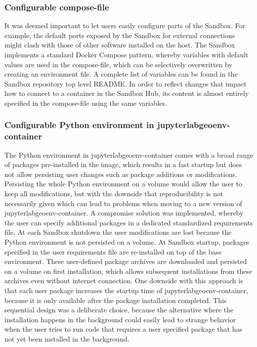 \documentclass[11pt, a4paper, oneside, parskip=full-]{scrartcl}
\begin{document}
\subsubsection*{Configurable compose-file}
It was deemed important to let users easily configure parts of the Sandbox. For
example, the default ports exposed by the Sandbox for external connections might
clash with those of other software installed on the host. The Sandbox implements
a standard Docker Compose pattern, whereby variables with default values are
used in the compose-file, which can be selectively overwritten by creating an
environment file\cite{composeenvfile}. A complete list of variables can be found
in the Sandbox repository top level README\cite{osgissandbox}. In order to
reflect changes that impact how to connect to a container in the Sandbox Hub,
its content is almost entirely specified in the compose-file using the same
variables.

\subsubsection*{Configurable Python environment in jupyterlabgeoenv-container}
The Python environment in jupyterlabgeoenv-container comes with a broad range of
packages pre-installed in the image, which results in a fast startup but does
not allow persisting user changes such as package additions or modifications.
Persisting the whole Python environment on a volume would allow the user to keep
all modifications, but with the downside that reproducibility is not necessarily
given which can lead to problems when moving to a new version of
jupyterlabgeoenv-container. A compromise solution was implemented, whereby the
user can specify additional packages in a dedicated standardized requirements
file. At each Sandbox shutdown the user modifications are lost because the
Python environment is not persisted on a volume. At Sandbox startup, packages
specified in the user requirements file are re-installed on top of the base
environment. These user-defined package archives are downloaded and persisted on
a volume on first installation, which allows subsequent installations from these
archives even without internet connection. One downside with this approach is
that each user package increases the startup time of jupyterlabgeoenv-container,
because it is only available after the package installation completed. This
sequential design was a deliberate choice, because the alternative where the
installation happens in the background could easily lead to strange behavior
when the user tries to run code that requires a user specified package that has
not yet been installed in the background.
\end{document}
